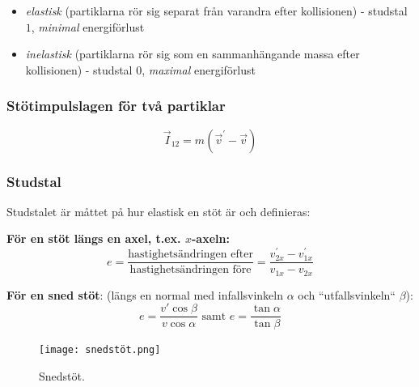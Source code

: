 \documentclass{article}
\newenvironment{ankiflashcard}[1]{}{}
\begin{document}
\begin{paracol}{2}
\begin{ankiflashcard}{Förklara de olika typerna av stötar som finns, hur energiförlusten ser ut och vad studstalet är.}
\begin{itemize}
    \item \textit{elastisk} (partiklarna rör sig separat från varandra efter kollisionen) - studstal $1$, \color{blue}\textit{minimal }\color{black} energiförlust
    \item  \textit{inelastisk } (partiklarna rör sig som en sammanhängande massa efter kollisionen) - studstal $0$, \color{red}\textit{maximal }\color{black} energiförlust
\end{itemize}
\end{ankiflashcard}

\begin{ankiflashcard}{Formulera stötimpulslagen för två partiklar}
\subsubsection{Stötimpulslagen för två partiklar}
$$\vec I_{12} = m(\vec v^{\prime} - \vec v)$$
\end{ankiflashcard}

\subsubsection{Studstal}
Studstalet är måttet på hur elastisk en stöt är och definieras:


\begin{ankiflashcard}{Ange de olika formlerna för studstal, inklusive snedstöt.}
    
\textbf{För en stöt längs en axel, t.ex. $x$-axeln:}
$$
e=\frac{\text{hastighetsändringen efter}}{\text{hastighetsändringen före}}=\frac{v_{2x}^{\prime}-{v_{1x}^{\prime}}}{v_{1x}-v_{2x}}
$$


\textbf{För en sned stöt}:
(längs en normal med infallsvinkeln $\alpha$ och ``utfallsvinkeln`` $\beta$):
$$
e=\frac{v'\cos\beta}{v\cos\alpha}\text{ samt } e =\frac{\tan \alpha}{\tan \beta}
$$
\begin{figure}[H]
    \centering
\texttt{[image: snedstöt.png]}
    \caption{Snedstöt.}
\end{figure}
\end{ankiflashcard}

\begin{ankiflashcard}{Rita upp de olika sträckorna i en ellips.}
    

\end{ankiflashcard}
\end{paracol}
\end{document}
